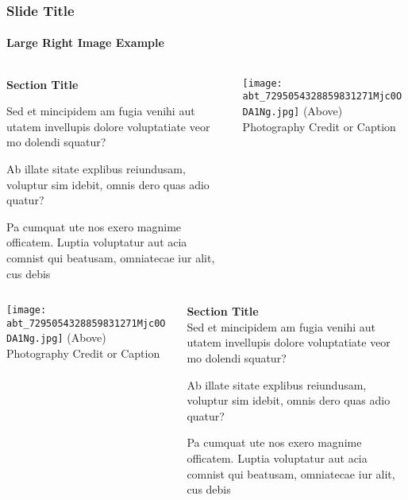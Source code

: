 \documentclass[
aspectratio=169, %
t, %
onlytextwidth, %
10pt, %
]{beamer}
\begin{document}
\begin{frame}
    \frametitle{Slide Title}
    \framesubtitle{Large Right Image Example}

    \begin{columns}[T] %
        \begin{column}{0.48\linewidth} %
            \textbf{Section Title}

            Sed et mincipidem am fugia venihi aut utatem invellupis dolore voluptatiate veor mo dolendi squatur?

            Ab illate sitate explibus reiundusam, voluptur sim idebit, omnis dero quas adio quatur?

            Pa cumquat ute nos exero magnime officatem. Luptia voluptatur aut acia comnist qui beatusam, omniatecae iur alit, cus debis
        \end{column}
        \begin{column}{0.48\linewidth} %
            \vspace{-3.5\baselineskip} %

            \texttt{[image: abt\_7295054328859831271Mjc0ODA1Ng.jpg]} %
            {\tiny\textcolor{ICLBlue}{(Above) Photography Credit or Caption}}
        \end{column}
    \end{columns}
\end{frame}


\begin{frame}
    \begin{columns}[T] %
        \begin{column}{0.48\linewidth} %
            \texttt{[image: abt\_7295054328859831271Mjc0ODA1Ng.jpg]} %
            {\tiny\textcolor{ICLBlue}{(Above) Photography Credit or Caption}}
        \end{column}
        \begin{column}{0.48\linewidth} %
            \textbf{Section Title}\\
            Sed et mincipidem am fugia venihi aut utatem invellupis dolore voluptatiate veor mo dolendi squatur?

            Ab illate sitate explibus reiundusam, voluptur sim idebit, omnis dero quas adio quatur?

            Pa cumquat ute nos exero magnime officatem. Luptia voluptatur aut acia comnist qui beatusam, omniatecae iur alit, cus debis
        \end{column}
    \end{columns}
\end{frame}
\end{document}
